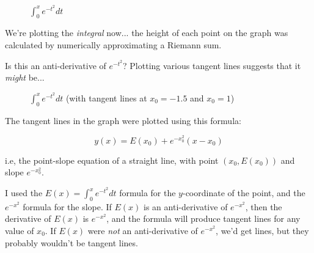 \begin{figure}[H]
\begin{center}
\begin{comment}
\begin{maximacode}
assume(x > 0)$
f(x) := exp(-x^2)$
F(x) := ''(integrate(f(x), x))$
pdfplot2d (F(x),
          [x, -6, 6], [ylabel, false], [grid2d, true], [legend, false],
          [color, red])$
\end{maximacode}
\end{comment}
\end{center}
\caption{$\int_0^x e^{-t^2} dt$}
\end{figure}

We're plotting the {\it integral} now... the height of each point on the graph
was calculated by numerically approximating a Riemann sum.

Is this an anti-derivative of $e^{-t^2}$?  Plotting various tangent lines suggests
that it {\it might} be...

\begin{figure}[H]
\begin{center}
\begin{comment}
\begin{maximacode}
line(x,x0,l) := if abs(x-x0) < l then F(x0) + f(x0)*(x-x0) else %
pdfplot2d ([F(x), 'line(x,-1.5,1), 'line(x,1,1)],
           [x, -6, 6], [y, -1, 1], [ylabel, false], [grid2d, true], [legend, false],
           [color, red, blue, blue], [xtics, 20], [ytics, 2])$
\end{maximacode}
\end{comment}
\end{center}
\caption{$\int_0^x e^{-t^2} dt$ (with tangent lines at $x_0=-1.5$ and $x_0=1$)}
\end{figure}

The tangent lines in the graph were plotted using this formula:

$$ y(x) = E(x_0) + e^{-x_0^2}(x-x_0)$$

i.e, the point-slope equation of a straight line, with point $(x_0, E(x_0))$ and slope $e^{-x_0^2}$.

I used the $E(x) = \int_0^x e^{-t^2} dt$ formula for the $y$-coordinate of the point,
and the $e^{-x^2}$ formula for the slope.
If $E(x)$ is an anti-derivative of $e^{-x^2}$, then the derivative of $E(x)$ is $e^{-x^2}$, and
the formula will produce tangent lines for any value of $x_0$.  If $E(x)$ were {\it not} an anti-derivative of $e^{-x^2}$,
we'd get lines, but they probably wouldn't be tangent lines.

